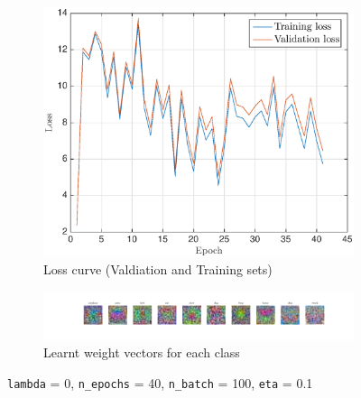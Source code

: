 \documentclass[journal, a4paper]{IEEEtran}
\begin{document}
\begin{figure}[h]
\centering
\begin{subfigure}{0.5\textwidth}
  \centering
  \includegraphics[scale=0.47]{figs/Loss_1}
  \caption{Loss curve (Valdiation and Training sets)}
\label{sf:11}
\end{subfigure}

\begin{subfigure}{0.5\textwidth}
  \centering
  \includegraphics[scale=0.25]{figs/WeightMatrix_1}
  \caption{Learnt weight vectors for each class}
\label{sf:12}
\end{subfigure}

\caption{\texttt{lambda} = 0, \texttt{n\_epochs} = 40, \texttt{n\_batch} = 100, \texttt{eta} = 0.1}
\label{sf:1}

\end{figure}
\end{document}
